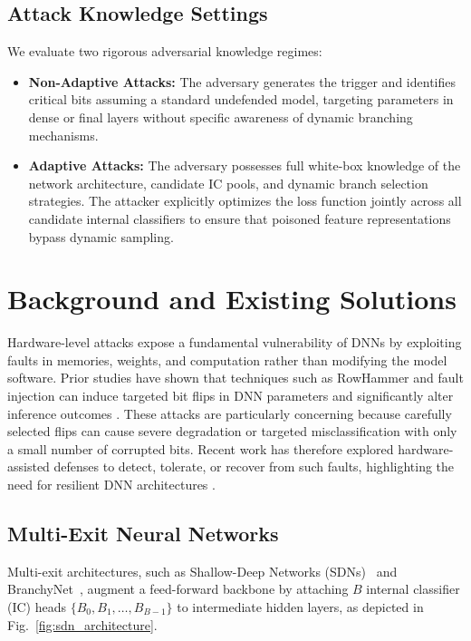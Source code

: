 \documentclass[conference,10pt]{IEEEtran}
\begin{document}
\subsection{Attack Knowledge Settings}
We evaluate two rigorous adversarial knowledge regimes:
\begin{itemize}
    \item \textbf{Non-Adaptive Attacks:} The adversary generates the trigger and identifies critical bits assuming a standard undefended model, targeting parameters in dense or final layers without specific awareness of dynamic branching mechanisms.
    \item \textbf{Adaptive Attacks:} The adversary possesses full white-box knowledge of the network architecture, candidate IC pools, and dynamic branch selection strategies. The attacker explicitly optimizes the loss function jointly across all candidate internal classifiers to ensure that poisoned feature representations bypass dynamic sampling.
\end{itemize}


\section{Background and Existing Solutions}

Hardware-level attacks expose a fundamental vulnerability of DNNs by exploiting faults in memories, weights, and computation rather than modifying the model software.
Prior studies have shown that techniques such as RowHammer and fault injection can induce targeted bit flips in DNN parameters and significantly alter inference outcomes \cite{hong2019terminal,yao2020deephammer}.
These attacks are particularly concerning because carefully selected flips can cause severe degradation or targeted misclassification with only a small number of corrupted bits.
Recent work has therefore explored hardware-assisted defenses to detect, tolerate, or recover from such faults, highlighting the need for resilient DNN architectures \cite{luo2021deepstrike,khoshavi2022hardenn}.

\subsection{Multi-Exit Neural Networks}
Multi-exit architectures, such as Shallow-Deep Networks (SDNs)~\cite{kaya2019sdn} and BranchyNet~\cite{teerapittayanon2016branchynet}, augment a feed-forward backbone by attaching $B$ internal classifier (IC) heads $\{B_0, B_1, \dots, B_{B-1}\}$ to intermediate hidden layers, as depicted in Fig.~\ref{fig:sdn_architecture}. 
\end{document}
